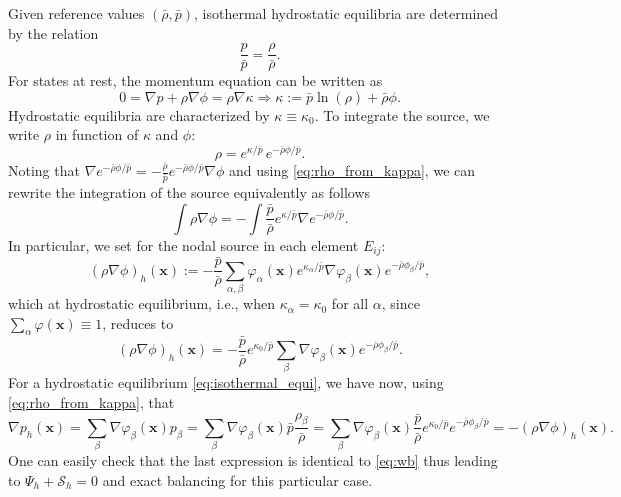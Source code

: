 \documentclass[a4paper,10pt]{article}
\begin{document}
Given reference values $(\bar\rho,\bar p)$, isothermal hydrostatic equilibria are determined by the relation
\begin{equation}\label{eq:isothermal_equi}
\dfrac{p}{\bar p} =\dfrac{\rho}{\bar\rho}.
\end{equation}
For states at rest, the momentum equation can be written as 
\begin{equation}
0 = \nabla p + \rho \nabla \phi =  \rho  \nabla\kappa \Rightarrow  \kappa := \bar p\ln (\rho)   + \bar\rho \phi .	
\end{equation}
Hydrostatic equilibria are characterized by $\kappa \equiv \kappa_0$. To integrate the source, we write $\rho$ in function of $\kappa$ and $\phi$: 
\begin{equation}\label{eq:rho_from_kappa}
	\rho =  e^{\kappa/\bar p}\, e^{-\bar\rho \phi/\bar p}.
\end{equation}
Noting that $\nabla e^{-\bar{\rho} \phi/\bar p} = - \frac{\bar \rho}{\bar p} e^{-\bar\rho \phi/\bar p} \nabla \phi$ and using \eqref{eq:rho_from_kappa}, we can rewrite the integration of the source equivalently as follows
$$
\int \rho \nabla \phi  = -  \int  \frac{\bar p}{\bar \rho} e^{\kappa / \bar p}    \nabla   e^{-\bar \rho \phi/\bar p}.
$$
In particular, we set for the nodal source in each element $E_{ij}$:
\begin{equation}\label{eq:wb}
\left( \rho \nabla \phi \right)_h(\mathbf x):=  -  \frac{\bar p}{\bar \rho} \sum_{\alpha,\beta}    \varphi_\alpha(\mathbf x)       e^{\kappa_\alpha /\bar p} \nabla \varphi_\beta(\mathbf x)   e^{-\bar \rho \phi_\beta/\bar p},
\end{equation}
which at hydrostatic equilibrium, i.e., when $\kappa_\alpha = \kappa_0$ for all $\alpha$, since $\sum_{\alpha} \varphi(\mathbf x)\equiv 1$, reduces to
$$
\left( \rho \nabla \phi \right)_h(\mathbf x) =  -  \frac{\bar p}{\bar \rho} e^{\kappa_0/\bar p}  \sum_{\beta}        \nabla \varphi_\beta(\mathbf x)   e^{-\bar \rho \phi_\beta/\bar p}.
$$
For a hydrostatic equilibrium \eqref{eq:isothermal_equi},  we have now, using \eqref{eq:rho_from_kappa}, that
$$
\nabla p_h (\mathbf x)=  \sum_\beta\nabla\varphi_\beta(\mathbf x) p_\beta =   \sum_\beta\nabla\varphi_\beta(\mathbf x)   \bar p \dfrac{\rho_\beta}{\bar \rho} 
=    \sum_\beta\nabla\varphi_\beta (\mathbf x)   \frac{\bar p}{\bar \rho}   e^{\kappa_0/\bar p}  e^{-\bar\rho \phi_\beta/\bar p} =- \left( \rho \nabla \phi \right)_h(\mathbf x).
$$
One can easily check that the last  expression is identical to \eqref{eq:wb} thus leading to 
$\Psi_h+\mathcal{S}_h=0$ and exact balancing for this particular case. 
\end{document}
